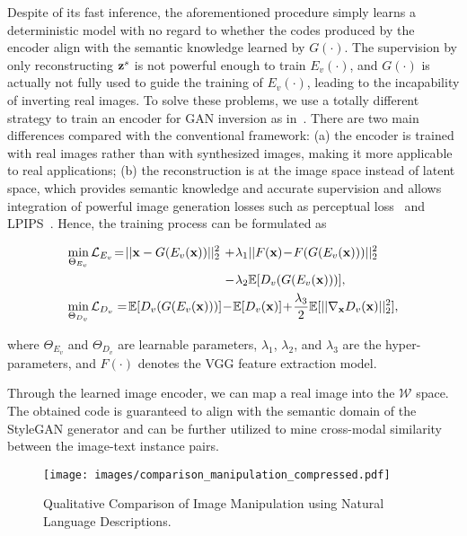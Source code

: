 \documentclass[final]{cvpr}
\newcommand{\x}{{\rm\bf x}}
\newcommand{\Loss}{\mathcal{L}}
\newcommand{\E}{\mathbb{E}}
\newcommand{\z}{{\rm\bf z}}
\begin{document}
Despite of its fast inference, the aforementioned procedure simply learns a deterministic model with no regard to whether the codes produced by the encoder align with the semantic knowledge learned by $G(\cdot)$.
The supervision by only reconstructing $\z^{s}$ is not powerful enough to train $E_v(\cdot)$, and $G(\cdot)$ is actually not fully used to guide the training of $E_v(\cdot)$, leading to the incapability of inverting real images.
To solve these problems, we use a totally different strategy to train an encoder for GAN inversion as in~\cite{zhu2020indomain}. 
There are two main differences compared with the conventional framework:
(a) the encoder is trained with real images rather than with synthesized images, making it more applicable to real applications;  
(b) the reconstruction is at the image space instead of latent space, which provides semantic knowledge and accurate supervision and allows integration of powerful image generation losses such as perceptual loss~\cite{johnson2016perceptual} and LPIPS~\cite{zhang2018unreasonable}.
Hence, the training process can be formulated as
\begin{small}
\begin{align}
  &\begin{aligned}
    \min_{\Theta_{E_v}}\Loss_{E_v} \!=\! ||\x - G(E_v(\x))||_2^2\ &\!+\!\lambda_{1} ||F(\x) \!-\! F(G(E_v(\x)))||_2^2\ \\
    &\!-\!\lambda_{2}\E[D_v(G(E_v(\x)))], \label{eq:encoder}
  \end{aligned} \\
  &\begin{aligned}
    \min_{\Theta_{D_v}}\Loss_{D_v} = \!\E[D_v(G(E_v(\x)))] \!- \!\E[D_v(\x)] \! + \!\frac{\lambda_3}{2} {\E}[||\nabla_{{\x}}D_v(\x)||_2^2],
  \end{aligned} \label{eq:discriminator}
\end{align}
\end{small}
where $\Theta_{E_v}$ and $\Theta_{D_v}$ are learnable parameters, 
$\lambda_{1}$, $\lambda_{2}$, and $\lambda_{3}$ are the hyper-parameters,
and $F(\cdot)$ denotes the VGG feature extraction model.

Through the learned image encoder, we can map a real image into the $\mathcal{W}$ space.
The obtained code is guaranteed to align with the semantic domain of the StyleGAN generator and can be further utilized to mine cross-modal similarity between the image-text instance pairs.

\begin{figure*}[ht]
\centering
\texttt{[image: images/comparison\_manipulation\_compressed.pdf]}
\caption{Qualitative Comparison of Image Manipulation using Natural Language Descriptions.}
\label{fig:comp_man}
\end{figure*}
\end{document}
